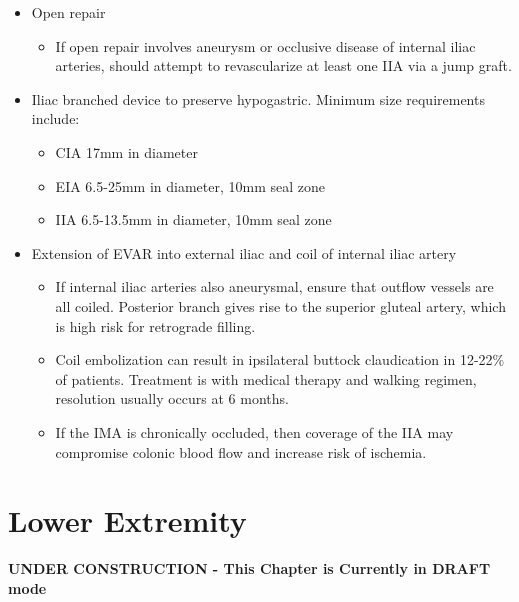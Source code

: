 \documentclass[
]{book}
\providecommand{\tightlist}{%
  \setlength{\itemsep}{0pt}\setlength{\parskip}{0pt}}
\begin{document}
\begin{itemize}
\item
  Open repair

  \begin{itemize}
  \tightlist
  \item
    If open repair involves aneurysm or occlusive disease of
    internal iliac arteries, should attempt to revascularize at
    least one IIA via a jump graft.\citep{krupski1998, huang2008}
  \end{itemize}
\item
  Iliac branched device to preserve hypogastric. Minimum size
  requirements include:

  \begin{itemize}
  \item
    CIA 17mm in diameter
  \item
    EIA 6.5-25mm in diameter, 10mm seal zone
  \item
    IIA 6.5-13.5mm in diameter, 10mm seal zone\citep{schneider2017}
  \end{itemize}
\item
  Extension of EVAR into external iliac and coil of internal iliac
  artery

  \begin{itemize}
  \item
    If internal iliac arteries also aneurysmal, ensure that outflow
    vessels are all coiled. Posterior branch gives rise to the
    superior gluteal artery, which is high risk for retrograde
    filling.\citep{ryer2012}
  \item
    Coil embolization can result in ipsilateral buttock claudication
    in 12-22\% of patients. Treatment is with medical therapy and
    walking regimen, resolution usually occurs at 6
    months.\citep{papazoglou2012, stokmans2013}
  \item
    If the IMA is chronically occluded, then coverage of the IIA may
    compromise colonic blood flow and increase risk of
    ischemia.\citep{angiletta2011, karch2000}
  \end{itemize}
\end{itemize}

\hypertarget{lower-extremity}{%
\chapter{Lower Extremity}\label{lower-extremity}}

\textbf{UNDER CONSTRUCTION - This Chapter is Currently in DRAFT mode}
\end{document}
